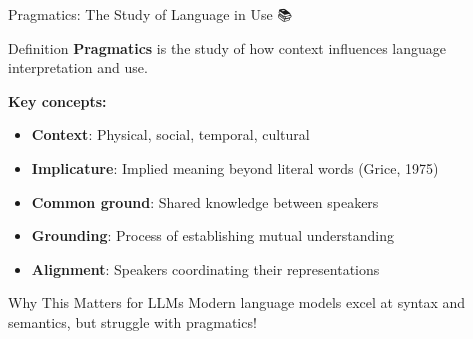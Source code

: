 \documentclass[aspectratio=169]{beamer}
\begin{document}
\begin{frame}{Pragmatics: The Study of Language in Use 📚}
\small
    \begin{block}{Definition}
        \textbf{Pragmatics} is the study of how context influences language interpretation and use.
    \end{block}

    \vspace{0.3cm}

    \textbf{Key concepts:}
    \begin{itemize}\setlength{\itemsep}{0pt}
        \item \textbf{Context}: Physical, social, temporal, cultural
        \item \textbf{Implicature}: Implied meaning beyond literal words (Grice, 1975)
        \item \textbf{Common ground}: Shared knowledge between speakers
        \item \textbf{Grounding}: Process of establishing mutual understanding
        \item \textbf{Alignment}: Speakers coordinating their representations
    \end{itemize}

    \vspace{0.3cm}

    \begin{alertblock}{Why This Matters for LLMs}
        Modern language models excel at syntax and semantics, but struggle with pragmatics!
    \end{alertblock}
\end{frame}
\end{document}
